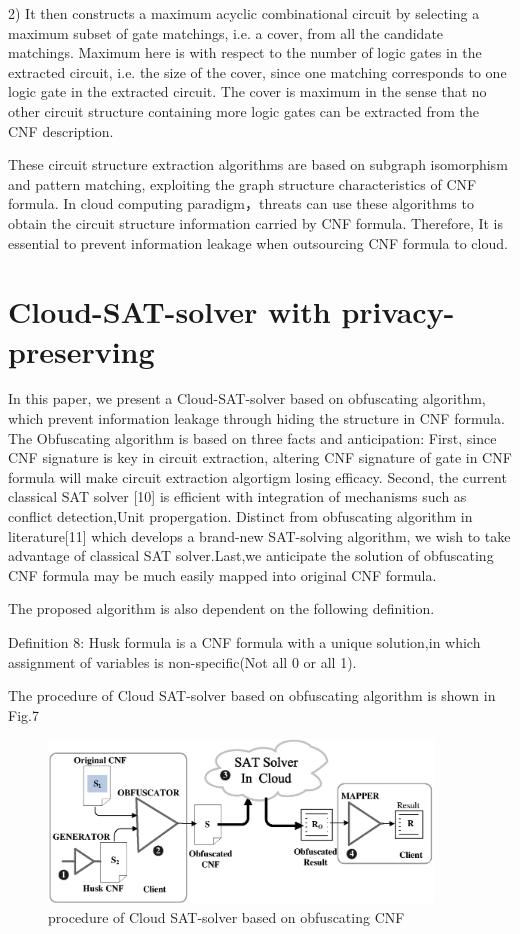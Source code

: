 \documentclass[runningheads,a4paper]{llncs}
\begin{document}
2) It then constructs a maximum acyclic combinational circuit by selecting a maximum subset of gate matchings, i.e. a cover, from all the candidate matchings. Maximum here is with respect to the number of logic gates in the extracted circuit, i.e. the size of the cover, since one matching corresponds to one logic gate in the extracted circuit. The cover is maximum in the sense that no other circuit structure containing more logic gates can be extracted from the CNF description.

These circuit structure extraction algorithms are based on subgraph isomorphism and pattern matching, exploiting the graph structure characteristics of CNF formula. In cloud computing paradigm，threats can use these algorithms to obtain the circuit structure information carried by CNF formula. Therefore, It is essential to prevent information leakage when outsourcing CNF formula to cloud.

\section{Cloud-SAT-solver with privacy-preserving}

In this paper, we present a Cloud-SAT-solver based on obfuscating algorithm, which prevent information leakage through hiding the structure in CNF formula. The Obfuscating algorithm is based on three facts and anticipation: First, since CNF signature is key in circuit extraction, altering CNF signature of gate in CNF formula will make circuit extraction algortigm losing efficacy. Second, the current classical SAT solver [10] is efficient with integration of mechanisms such as conflict detection,Unit propergation. Distinct from obfuscating algorithm in literature[11] which develops a brand-new SAT-solving algorithm, we wish to take advantage of classical SAT solver.Last,we anticipate the solution of obfuscating CNF formula may be much easily mapped into original CNF formula.

The proposed algorithm is also dependent on the following definition.

\noindent Definition 8: Husk formula is a CNF formula with a unique solution,in which assignment of variables is non-specific(Not all 0 or all 1).

The procedure of Cloud SAT-solver based on obfuscating algorithm is shown in Fig.7
\begin{figure}
\centering
\includegraphics[width=10.2cm]{a5}
\caption{procedure of Cloud SAT-solver based on obfuscating CNF}
\end{figure}
\end{document}
